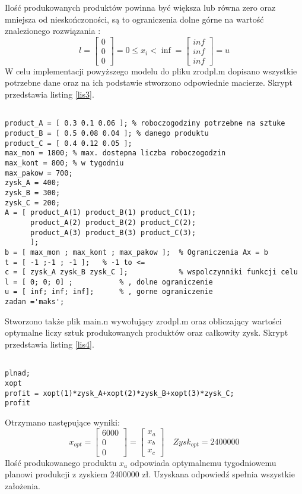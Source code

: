 \documentclass[a4paper,15pt]{article}
\begin{document}
Ilość produkowanych produktów powinna być większa lub równa zero oraz mniejsza od nieskończoności, są to ograniczenia dolne górne na wartość znalezionego rozwiązania :
\begin{equation*}
l = 
\begin{bmatrix}
0 \\
0 \\
0
\end{bmatrix}
=
0 \leq x_{i} < \inf
=
\begin{bmatrix}
inf \\ 
inf \\
inf
\end{bmatrix} = 
u
\end{equation*}  
W celu implementacji powyższego modelu do pliku zrodpl.m dopisano wszystkie potrzebne dane oraz na ich podstawie stworzono odpowiednie macierze. Skrypt przedstawia listing \ref{lis3}.
\begin{lstlisting}[caption=zrodpl.m, captionpos=b,
label=lis3, firstnumber=12,frame=single]

product_A = [ 0.3 0.1 0.06 ]; % roboczogodziny potrzebne na sztuke 
product_B = [ 0.5 0.08 0.04 ]; % danego produktu
product_C = [ 0.4 0.12 0.05 ];
max_mon = 1800; % max. dostepna liczba roboczogodzin
max_kont = 800; % w tygodniu
max_pakow = 700;
zysk_A = 400;
zysk_B = 300;
zysk_C = 200;
A = [ product_A(1) product_B(1) product_C(1);
      product_A(2) product_B(2) product_C(2);
      product_A(3) product_B(3) product_C(3);
      ];
b = [ max_mon ; max_kont ; max_pakow ];  % Ograniczenia Ax = b
t = [ -1 ;-1 ; -1 ];   % -1 to <=
c = [ zysk_A zysk_B zysk_C ];            % wspolczynniki funkcji celu
l = [ 0; 0; 0] ;           % , dolne ograniczenie
u = [ inf; inf; inf];      % , gorne ograniczenie
zadan ='maks';

\end{lstlisting}

Stworzono także plik main.n wywołujący zrodpl.m oraz obliczający wartości optymalne liczy sztuk produkowanych produktów oraz całkowity zysk. Skrypt przedstawia listing \ref{lis4}.
\newpage
\begin{lstlisting}[caption=main.m, captionpos=b,
label=lis4, firstnumber=12,frame=single]

plnad;
xopt 
profit = xopt(1)*zysk_A+xopt(2)*zysk_B+xopt(3)*zysk_C;
profit
\end{lstlisting}

Otrzymano następujące wyniki: 
\begin{equation*}
x_{opt} = 
\begin{bmatrix}
6000 \\
0 \\ 
0
\end{bmatrix}
= 
\begin{bmatrix}
x_{a} \\
x_{b} \\
x_{c}
\end{bmatrix}
\quad
Zysk_{opt} = 2400000
\end{equation*}
Ilość produkowanego produktu \( x_{a} \) odpowiada optymalnemu tygodniowemu planowi produkcji z zyskiem 2400000 zł. Uzyskana odpowiedź spełnia wszystkie założenia. 
\end{document}
